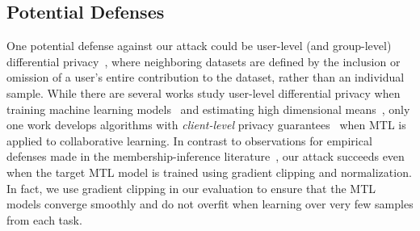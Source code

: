 \subsection{Potential Defenses}
One potential defense against our attack could be user-level (and group-level) differential privacy~\cite{dwork-2006-dmns}, where neighboring datasets are defined by the inclusion or omission of a user's entire contribution to the dataset, rather than an individual sample. While there are several works study user-level differential privacy when training machine learning models~\cite{levy-2021-learninguserdp, chua-2024-privacyunituserlevel, charles-2024-finetuningllmuserlevel} and estimating high dimensional means~\cite{cummings-2022-userlevelmean, agarwal-2025-personlevel}, only one work develops algorithms with \emph{client-level} privacy guarantees~\cite{hu2023privatemtl} when MTL is applied to collaborative learning. In contrast to observations for empirical defenses made in the membership-inference literature~\cite{carlini-2022-lira}, our attack succeeds even when the target MTL model is trained using gradient clipping and normalization. In fact, we use gradient clipping in our evaluation to ensure that the MTL models converge smoothly and do not overfit when learning over very few samples from each task.


